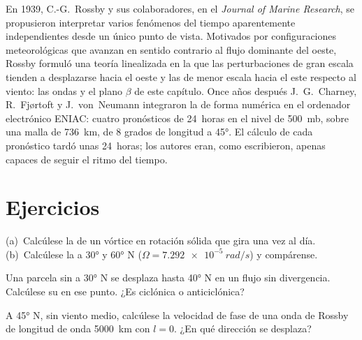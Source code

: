 \begin{history}
En 1939, C.-G.~Rossby y sus colaboradores, en el \emph{Journal of Marine
Research}, se propusieron interpretar varios fenómenos del tiempo aparentemente
independientes desde un único punto de vista. Motivados por configuraciones meteorológicas
que avanzan en sentido contrario al flujo dominante del oeste, Rossby formuló
una teoría linealizada en la que las perturbaciones de gran escala tienden a desplazarse hacia el oeste
y las de menor escala hacia el este respecto al viento: las ondas y el
plano $\beta$ de este capítulo. Once años después J.~G.~Charney,
R.~Fjørtoft y J.~von~Neumann integraron la 
de forma numérica en el ordenador electrónico ENIAC: cuatro pronósticos de 24~horas en
el nivel de \qty{500}{mb}, sobre una malla de \qty{736}{km}, de 8 grados de longitud
a \ang{45}. El cálculo de cada pronóstico tardó unas 24~horas; los autores
eran, como escribieron, apenas capaces de seguir el ritmo del tiempo.
\end{history}

\section{Ejercicios}

\begin{exercise}[$\star$]\label{exo:b3:atmospheric-dynamics:1}
(a)~Calcúlese la  de un vórtice en rotación sólida que gira
una vez al día. (b)~Calcúlese la  a \ang{30} y \ang{60} N
($\Omega = \qty{7.292e-5}{rad/s}$) y compárense.
\end{exercise}

\begin{exercise}[$\star$]\label{exo:b3:atmospheric-dynamics:2}
Una parcela sin  a \ang{30} N se desplaza hasta \ang{40} N en un
flujo sin divergencia. Calcúlese su  en ese punto. ¿Es
ciclónica o anticiclónica?
\end{exercise}

\begin{exercise}[$\star$]\label{exo:b3:atmospheric-dynamics:3}
A \ang{45} N, sin viento medio, calcúlese la velocidad de fase de una onda de Rossby
de longitud de onda \qty{5000}{km} con $l = 0$. ¿En qué dirección se desplaza?
\end{exercise}

